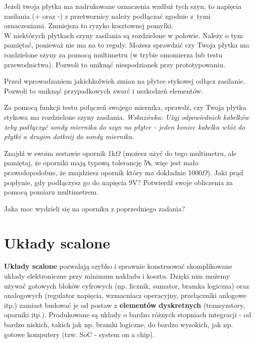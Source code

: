 \documentclass{pdfBooklets}
\begin{document}
Jeżeli twoja płytka ma nadrukowane oznaczenia wzdłuż tych szyn, to napięcia zasilania (+ oraz -) z przetwornicy należy podłączać zgodnie z~tymi
oznaczeniami. Zmniejsza to ryzyko kosztownej pomyłki.\\

W niektórych płytkach szyny zasilania są rozdzielone w połowie. Należy o tym pamiętać, ponieważ nie ma na to reguły.
Możesz sprawdzić czy Twoja płytka ma rozdzielone szyny za pomocą multimetru (w trybie omomierza lub testu przewodnictwa). Pozwoli to uniknąć
niespodzianek przy prototypowaniu.

\begin{ProTip}{}
  Przed wprowadzaniem jakichkolwiek zmian na płytce stykowej odłącz zasilanie. Pozwoli to uniknąć przypadkowych zwarć i uszkodzeń elementów.
\end{ProTip}

\begin{Zadanie}{}{}
  Za pomocą funkcji testu połączeń swojego miernika, sprawdź, czy Twoja płytka stykowa ma rozdzielone szyny zasilania.
  \textit{Wskazówka: Użyj odpowiednich kabelków żeby podłączyć sondy miernika do szyn na płytce - jeden koniec kabelka włóż do płytki a drugim
    dotknij do sondy miernika.}
\end{Zadanie}

\begin{Zadanie}{}{}
  Znajdź w swoim zestawie opornik 1k$\Omega$ (możesz użyć do tego multimetru, ale pamiętaj, że oporniki mają typową tolerancję 5\Verb$%
  więc jest mało prawodopodobne, że znajdziesz opornik który ma dokładnie 1000$\Omega$). Jaki prąd popłynie, gdy podłączysz go do napięcia 9V?
  Potwierdź swoje obliczenia za pomocą pomiaru multimetrem.
\end{Zadanie}

\begin{Zadanie}{}{}
  Jaka moc wydzieli się na oporniku z poprzedniego zadania?
\end{Zadanie}


\section{Układy scalone}
\textbf{Układy scalone} pozwalają szybko i sprawnie konstruować skomplikowane układy elektroniczne przy minimum nakładu i kosztu. Dzięki nim możemy
używać gotowych bloków cyfrowych (np. licznik, sumator, bramka logiczna) oraz analogowych (regulator napięcia, wzmacniacz operacyjny,
przełączniki anlogowe itp.) zamiast budować je od postaw z \textbf{elementów dyskretnych} (transyzstory, oporniki itp.). Produkowane są
układy o bardzo różnych stopniach integracji - od bardzo niskich, takich jak np. bramki logiczne, do bardzo wysokich, jak np. gotowe komputery
(tzw. SoC - system on a chip).
\\
\end{document}

